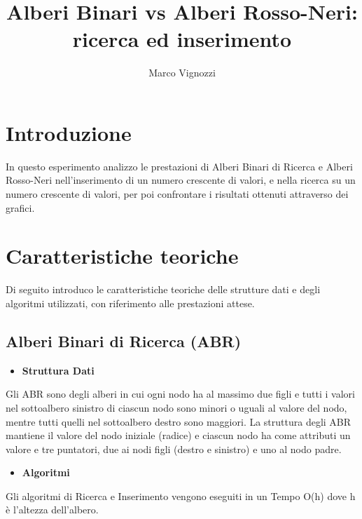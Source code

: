 \documentclass{article}
\title{Alberi Binari vs Alberi Rosso-Neri: ricerca ed inserimento}
\author{Marco Vignozzi}
\begin{document}
\maketitle

\section{Introduzione}
In questo esperimento analizzo le prestazioni di Alberi Binari di Ricerca e Alberi Rosso-Neri nell'inserimento di un numero crescente di valori, e nella ricerca su un numero crescente di valori, per poi confrontare i risultati ottenuti attraverso dei grafici.

\section{Caratteristiche teoriche}
Di seguito introduco le caratteristiche teoriche delle strutture dati e degli algoritmi utilizzati, con riferimento alle prestazioni attese.

\subsection{Alberi Binari di Ricerca (ABR)}
\begin{itemize}
    \item \textbf{Struttura Dati}
\end{itemize}
Gli ABR sono degli alberi in cui ogni nodo ha al massimo due figli e tutti i valori nel sottoalbero sinistro di ciascun nodo sono minori o uguali al valore del nodo, mentre tutti quelli nel sottoalbero destro sono maggiori. La struttura degli ABR mantiene il valore del nodo iniziale (radice) e ciascun nodo ha come attributi un valore e tre puntatori, due ai nodi figli (destro e sinistro) e uno al nodo padre.
\begin{itemize}
    \item \textbf{Algoritmi}
\end{itemize}
Gli algoritmi di Ricerca e Inserimento vengono eseguiti in un Tempo O(h) dove h è l'altezza dell'albero.
\end{document}
